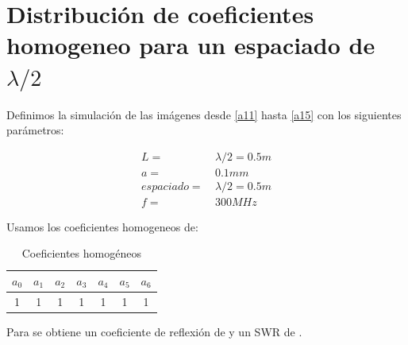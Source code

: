 \documentclass[11pt]{book}
\begin{document}
\newpage

\section{Distribución de coeficientes homogeneo para un espaciado de \boldmath$\lambda/2$}

\noindent Definimos la simulación de las imágenes desde \eqref{a11} hasta \eqref{a15} con los siguientes parámetros:

\begin{align*}
	L =			& \ \lambda/2 = 0.5m \\
	a =			& \ 0.1mm \\
	espaciado = & \ \lambda / 2 = 0.5m \\
	f =			& \ 300MHz
\end{align*}

\noindent Usamos los coeficientes homogeneos de:
\begin{table}[!ht]
	\centering
	\begin{tabular}{c|c|c|c|c|c|c}
		$a_0$ & $a_1$ & $a_2$ & $a_3$ & $a_4$ & $a_5$ & $a_6$ \\ \hline
		1 & 1 & 1 & 1 & 1 & 1 & 1 \\
	\end{tabular}
	\caption{Coeficientes homogéneos}
	\label{tab:1}
\end{table}

\noindent Para  se obtiene un coeficiente de reflexión de  y un SWR de . 
\end{document}
